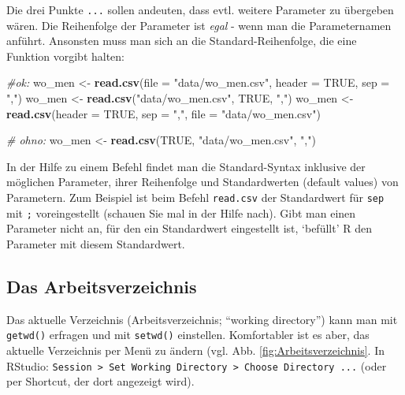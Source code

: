\documentclass[12pt,ngerman,]{book}
\makeatletter
\newenvironment{Shaded}{\begin{snugshade}}{\end{snugshade}}
\newcommand{\KeywordTok}[1]{\textcolor[rgb]{0.13,0.29,0.53}{\textbf{#1}}}
\newcommand{\DataTypeTok}[1]{\textcolor[rgb]{0.13,0.29,0.53}{#1}}
\newcommand{\StringTok}[1]{\textcolor[rgb]{0.31,0.60,0.02}{#1}}
\newcommand{\CommentTok}[1]{\textcolor[rgb]{0.56,0.35,0.01}{\textit{#1}}}
\newcommand{\OtherTok}[1]{\textcolor[rgb]{0.56,0.35,0.01}{#1}}
\newcommand{\NormalTok}[1]{#1}
\newenvironment{kframe}{%
\medskip{}
\setlength{\fboxsep}{.8em}
 \def\at@end@of@kframe{}%
 \ifinner\ifhmode%
  \def\at@end@of@kframe{\end{minipage}}%
  \begin{minipage}{\columnwidth}%
 \fi\fi%
 \def\FrameCommand##1{\hskip\@totalleftmargin \hskip-\fboxsep
 \colorbox{shadecolor}{##1}\hskip-\fboxsep
     \hskip-\linewidth \hskip-\@totalleftmargin \hskip\columnwidth}%
 \MakeFramed {\advance\hsize-\width
   \@totalleftmargin\z@ \linewidth\hsize
   \@setminipage}}%
 {\par\unskip\endMakeFramed%
 \at@end@of@kframe}
\renewenvironment{Shaded}{\begin{kframe}}{\end{kframe}}
\theoremstyle{definition}
\theoremstyle{definition}
\theoremstyle{remark}
\makeatother
\begin{document}
Die drei Punkte \texttt{...} sollen andeuten, dass evtl. weitere
Parameter zu übergeben wären. Die Reihenfolge der Parameter ist
\emph{egal} - wenn man die Parameternamen anführt. Ansonsten muss man
sich an die Standard-Reihenfolge, die eine Funktion vorgibt halten:

\begin{Shaded}
\begin{Highlighting}[]
\CommentTok{#ok:}
\NormalTok{wo_men <-}\StringTok{ }\KeywordTok{read.csv}\NormalTok{(}\DataTypeTok{file =} \StringTok{"data/wo_men.csv"}\NormalTok{, }\DataTypeTok{header =} \OtherTok{TRUE}\NormalTok{, }\DataTypeTok{sep =} \StringTok{","}\NormalTok{)}
\NormalTok{wo_men <-}\StringTok{ }\KeywordTok{read.csv}\NormalTok{(}\StringTok{"data/wo_men.csv"}\NormalTok{, }\OtherTok{TRUE}\NormalTok{, }\StringTok{","}\NormalTok{)}
\NormalTok{wo_men <-}\StringTok{ }\KeywordTok{read.csv}\NormalTok{(}\DataTypeTok{header =} \OtherTok{TRUE}\NormalTok{, }\DataTypeTok{sep =} \StringTok{","}\NormalTok{, }\DataTypeTok{file =} \StringTok{"data/wo_men.csv"}\NormalTok{)}


\CommentTok{# ohno:}
\NormalTok{wo_men <-}\StringTok{ }\KeywordTok{read.csv}\NormalTok{(}\OtherTok{TRUE}\NormalTok{, }\StringTok{"data/wo_men.csv"}\NormalTok{, }\StringTok{","}\NormalTok{)}
\end{Highlighting}
\end{Shaded}

In der Hilfe zu einem Befehl findet man die Standard-Syntax inklusive
der möglichen Parameter, ihrer Reihenfolge und Standardwerten (default
values) von Parametern. Zum Beispiel ist beim Befehl \texttt{read.csv}
der Standardwert für \texttt{sep} mit \texttt{;} voreingestellt (schauen
Sie mal in der Hilfe nach). Gibt man einen Parameter nicht an, für den
ein Standardwert eingestellt ist, `befüllt' R den Parameter mit diesem
Standardwert.

\subsection{Das Arbeitsverzeichnis}\label{wd}

Das aktuelle Verzeichnis (Arbeitsverzeichnis; ``working directory'')
kann man mit \texttt{getwd()} erfragen und mit \texttt{setwd()}
einstellen. Komfortabler ist es aber, das aktuelle Verzeichnis per Menü
zu ändern (vgl. Abb. \ref{fig:Arbeitsverzeichnis}. In RStudio:
\texttt{Session\ \textgreater{}\ Set\ Working\ Directory\ \textgreater{}\ Choose\ Directory\ ...}
(oder per Shortcut, der dort angezeigt wird).
\end{document}
